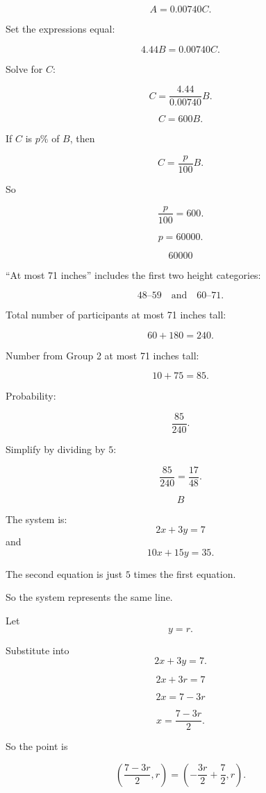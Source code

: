 \documentclass[11pt]{article}
\newcommand{\circnum}[1]{%
\tikz[baseline=(char.base)]{
\node[
circle,
draw=nppurpledark,
fill=nplight,
inner sep=1.4pt,
line width=0.8pt,
text=nppurpledark
] (char) {\small\textbf{#1}};
}}
\begin{document}
\[
A=0.00740C.
\]

Set the expressions equal:

\[
4.44B=0.00740C.
\]

Solve for \(C\):

\[
C=\frac{4.44}{0.00740}B.
\]

\[
C=600B.
\]

If \(C\) is \(p\%\) of \(B\), then

\[
C=\frac{p}{100}B.
\]

So

\[
\frac p{100}=600.
\]

\[
p=60000.
\]

\[
\boxed{60000}
\]

\bigskip

\textbf{\circnum{15}}

“At most 71 inches” includes the first two height categories:

\[
48\text{--}59
\quad \text{and}\quad
60\text{--}71.
\]

Total number of participants at most 71 inches tall:

\[
60+180=240.
\]

Number from Group 2 at most 71 inches tall:

\[
10+75=85.
\]

Probability:

\[
\frac{85}{240}.
\]

Simplify by dividing by \(5\):

\[
\frac{85}{240}=\frac{17}{48}.
\]

\[
\boxed{B}
\]

\bigskip

\textbf{\circnum{16}}

The system is:
\[
2x+3y=7
\]
and
\[
10x+15y=35.
\]

The second equation is just \(5\) times the first equation.

So the system represents the same line.

Let
\[
y=r.
\]

Substitute into
\[
2x+3y=7.
\]

\[
2x+3r=7
\]

\[
2x=7-3r
\]

\[
x=\frac{7-3r}{2}.
\]

So the point is

\[
\left(\frac{7-3r}{2},r\right)
=
\left(-\frac{3r}{2}+\frac72,r\right).
\]
\end{document}
